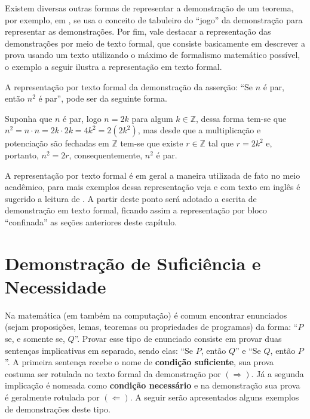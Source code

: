 Existem diversas outras formas de representar a demonstração de um teorema, por exemplo, em \cite{fmcbook}, se usa o conceito de tabuleiro do ``jogo'' da demonstração para representar as demonstrações. Por fim, vale destacar a representação das demonstrações por meio de texto formal, que consiste basicamente em descrever a prova usando um texto utilizando o máximo de formalismo matemático possível, o exemplo a seguir ilustra a representação em texto formal.

\begin{exemplo}
	A representação por texto formal da demonstração da asserção: ``Se $n$ é par, então $n^2$ é par'', pode ser da seguinte forma.
\end{exemplo}

\begin{prova}
		Suponha que $n$ é par, logo $n = 2k$ para algum $k \in \mathbb{Z}$, dessa forma tem-se que $n^2 = n \cdot n = 2k \cdot 2k = 4k^2 = 2(2k^2)$, mas desde que a multiplicação e potenciação são fechadas em $\mathbb{Z}$ tem-se que existe $r \in \mathbb{Z}$ tal que $r = 2k^2$ e, portanto, $n^2 = 2r$, consequentemente,  $n^2$ é par.
\end{prova}

A representação por texto formal é em geral a maneira utilizada de fato no meio acadêmico, para mais exemplos dessa representação veja \cite{valdi2016master, valdi2020phd, annax2019phd, thadeu2021phd, rui2019phd} e com texto em inglês é sugerido a leitura de \cite{vania2019phd, velleman2019comProvar}. A partir deste ponto será adotado a escrita de demonstração em texto formal, ficando assim a representação por bloco ``confinada'' as seções anteriores deste capítulo.

\section{Demonstração de Suficiência e Necessidade}

Na matemática (em também na computação) é comum encontrar enunciados (sejam proposições, lemas, teoremas ou propriedades de programas) da forma: ``$P$ se, e somente se, $Q$''. Provar esse tipo de enunciado consiste em  provar duas sentenças implicativas em separado, sendo elas: ``Se $P$, então $Q$'' e ``Se $Q$, então $P$''.  A primeira sentença recebe o nome de \textbf{condição suficiente}, sua prova costuma ser rotulada no texto formal da demonstração por $(\Rightarrow)$. Já a segunda implicação é nomeada como \textbf{condição necessário} e na demonstração sua prova é geralmente rotulada por $(\Leftarrow)$. A seguir serão apresentados alguns exemplos de demonstrações deste tipo.


